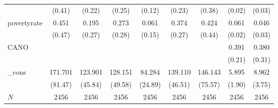 {\begin{tabular}{l*{8}{c}}
            &                   (0.41)         &                   (0.22)         &                   (0.25)         &                   (0.12)         &                   (0.23)         &                   (0.38)         &                   (0.02)         &                   (0.03)         \\
povertyrate &                    0.451         &                    0.195         &                    0.273         &                    0.061         &                    0.374         &                    0.424         &                    0.061\sym{***}&                    0.046         \\
            &                   (0.47)         &                   (0.27)         &                   (0.28)         &                   (0.15)         &                   (0.27)         &                   (0.44)         &                   (0.02)         &                   (0.03)         \\
CANO        &                                  &                                  &                                  &                                  &                                  &                                  &                    0.391         &                    0.380         \\
            &                                  &                                  &                                  &                                  &                                  &                                  &                   (0.21)         &                   (0.31)         \\
\_cons      &                  171.701\sym{*}  &                  123.901\sym{**} &                  128.151\sym{**} &                   84.284\sym{***}&                  139.110\sym{**} &                  146.143         &                    5.895\sym{**} &                    8.962\sym{*}  \\
            &                  (81.47)         &                  (45.84)         &                  (49.58)         &                  (24.89)         &                  (46.51)         &                  (75.57)         &                   (1.90)         &                   (3.75)         \\
\hline
\(N\)       &                     2456         &                     2456         &                     2456         &                     2456         &                     2456         &                     2456         &                     2456         &                     2456         \\
\hline\hline
\end{tabular}
}
